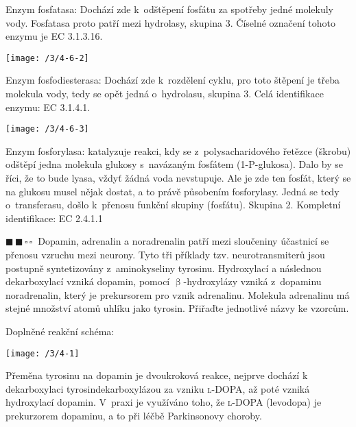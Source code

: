 \documentclass{book}
\newcommand{\dva}{$\blacksquare \, \blacksquare \, \square \, \square \; \; $}
\renewenvironment{quotation}{\par}{\par} %
\begin{document}
Enzym fosfatasa: Dochází zde k~odštěpení fosfátu za spotřeby jedné
molekuly vody. Fosfatasa proto patří mezi hydrolasy, skupina 3. Číselné
označení tohoto enzymu je EC 3.1.3.16.

\begin{center}
\texttt{[image: /3/4-6-2]}
\end{center}

Enzym fosfodiesterasa: Dochází zde k~rozdělení cyklu, pro toto
štěpení je třeba molekula vody, tedy se opět jedná o~hydrolasu, skupina
3. Celá identifikace enzymu: EC 3.1.4.1.

\begin{center}
\texttt{[image: /3/4-6-3]}
\end{center}

Enzym fosforylasa: katalyzuje reakci, kdy se z~polysacharidového
řetězce (škrobu) odštěpí jedna molekula glukosy s~navázaným fosfátem
(1-P-glukosa). Dalo by se říci, že to bude lyasa, vždyť žádná voda
nevstupuje. Ale je zde ten fosfát, který se na glukosu musel nějak
dostat, a to právě působením fosforylasy. Jedná se tedy o~transferasu,
došlo k~přenosu funkční skupiny (fosfátu). Skupina 2. Kompletní identifikace:
EC 2.4.1.1 

\hrulefill %
\begin{quotation}
\dva Dopamin, adrenalin a noradrenalin patří mezi sloučeniny účastnicí se přenosu vzruchu mezi neurony. Tyto tři příklady tzv. neurotransmiterů jsou postupně syntetizovány z~aminokyseliny tyrosinu. Hydroxylací
a následnou dekarboxylací vzniká dopamin, pomocí $\upbeta$-hydroxylázy
vzniká z~dopaminu noradrenalin, který je prekursorem
pro vznik adrenalinu. Molekula adrenalinu má stejné množství atomů
uhlíku jako tyrosin. Přiřaďte jednotlivé názvy ke vzorcům. 
\end{quotation} \dotfill \par 

Doplněné reakční schéma:
\noindent \begin{center}

\texttt{[image: /3/4-1]}

\par\end{center}

Přeměna tyrosinu na dopamin je dvoukroková reakce, nejprve dochází
k dekarboxylaci tyrosindekarboxylázou za vzniku \textsc{l}-DOPA, až poté vzniká
hydroxylací dopamin. V~praxi je využíváno toho, že \textsc{l}-DOPA (levodopa)
je prekurzorem dopaminu, a to při léčbě Parkinsonovy choroby. 
\end{document}
